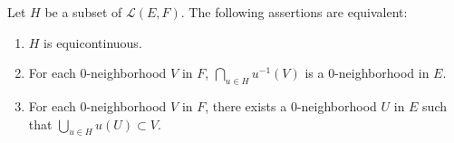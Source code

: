 Let \(H\) be a subset of \(\mathcal{L}(E, F)\). The following assertions are equivalent:
\begin{enumerate}
\item[(a)] \(H\) is equicontinuous.
\item[(b)] For each \(0\)-neighborhood \(V\) in \(F\), \(\bigcap_{u \in H} u^{-1}(V)\) is a \(0\)-neighborhood in \(E\).
\item[(c)] For each \(0\)-neighborhood \(V\) in \(F\), there exists a \(0\)-neighborhood \(U\) in \(E\) such that \(\bigcup_{u \in H} u(U) \subset V\).
\end{enumerate}